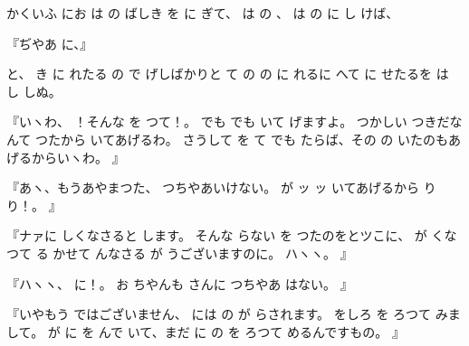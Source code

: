 かくいふ
にお
は
の
ばしき
を
に
ぎて、
は
の
、
は
の
に
し
けば、

『ぢやあ
に、』

と、
き
に
れたる
の
で
げしばかりと
て
の
の
に
れるに
へて
に
せたるを
は
し
しぬ。

『いヽわ、
！そんな
を
つて！。
でも
でも
いて
げますよ。
つかしい
つきだなんて
つたから
いてあげるわ。
さうして
を
て
でも
たらば、その
の
いたのもあげるからいヽわ。
』

『あヽ、もうあやまつた、
つちやあいけない。
が
ッ
ッ
いてあげるから
り
り！。
』

『ナァに
しくなさると
します。
そんな
らない
を
つたのをとツこに、
が
くなつて
る
かせて
んなさる
が
うございますのに。
ハヽヽ。
』

『ハヽヽ、
に！。
お
ちやんも
さんに
つちやあ
はない。
』

『いやもう
ではございません、
には
の
が
らされます。
をしろ
を
ろつて
みまして。
が
に
を
んで
いて、まだ
に
の
を
ろつて
めるんですもの。
』

